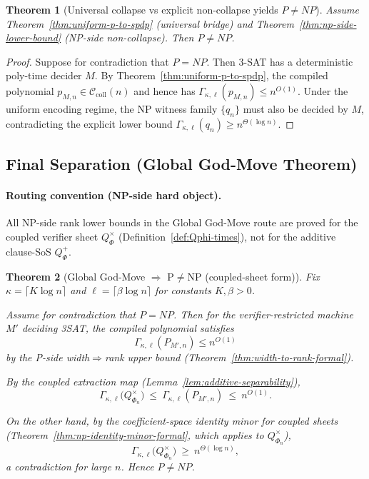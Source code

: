 \documentclass[12pt]{article}
\newtheorem{theorem}{Theorem}
\theoremstyle{definition}
\theoremstyle{definition}
\theoremstyle{remark}
\theoremstyle{remark}
\begin{document}
\begin{theorem}[Universal collapse vs explicit non-collapse yields $P\neq NP$]
\label{thm:universal-separation-criterion}
Assume Theorem~\ref{thm:uniform-p-to-spdp} (universal bridge) and
Theorem~\ref{thm:np-side-lower-bound} (NP-side non-collapse).
Then $P\neq NP$.
\end{theorem}

\begin{proof}
Suppose for contradiction that $P=NP$. Then $3$-SAT has a deterministic poly-time
decider $M$. By Theorem~\ref{thm:uniform-p-to-spdp}, the compiled polynomial
$p_{M,n}\in \mathcal{C}_{\mathrm{coll}}(n)$ and hence has
$\Gamma_{\kappa,\ell}(p_{M,n})\le n^{O(1)}$. Under the uniform encoding regime, the
NP witness family $\{q_n\}$ must also be decided by $M$, contradicting the
explicit lower bound $\Gamma_{\kappa,\ell}(q_n)\ge n^{\Theta(\log n)}$.
\end{proof}

\subsection{Final Separation (Global God-Move Theorem)}

\paragraph{Routing convention (NP-side hard object).}
All NP-side rank lower bounds in the Global God-Move route are proved for the coupled
verifier sheet $Q^{\times}_\Phi$ (Definition~\ref{def:Qphi-times}), not for the additive
clause-SoS $Q^{+}_\Phi$.

\begin{theorem}[Global God-Move $\Rightarrow$ P$\neq$NP (coupled-sheet form)]
\label{thm:godmove-formal}
Fix $\kappa=\lceil K\log n\rceil$ and $\ell=\lceil \beta\log n\rceil$ for constants $K,\beta>0$.

Assume for contradiction that $P=NP$. Then for the verifier-restricted machine $M'$
deciding 3SAT, the compiled polynomial satisfies
\[
\Gamma_{\kappa,\ell}(P_{M',n}) \le n^{O(1)}
\]
by the P-side width$\Rightarrow$rank upper bound (Theorem~\ref{thm:width-to-rank-formal}).

By the coupled extraction map (Lemma~\ref{lem:additive-separability}),
\[
\Gamma_{\kappa,\ell}\!\big(Q^{\times}_{\Phi_n}\big)
\ \le\ \Gamma_{\kappa,\ell}(P_{M',n})
\ \le\ n^{O(1)}.
\]

On the other hand, by the coefficient-space identity minor for coupled sheets
(Theorem~\ref{thm:np-identity-minor-formal}, which applies to $Q^{\times}_{\Phi_n}$),
\[
\Gamma_{\kappa,\ell}\!\big(Q^{\times}_{\Phi_n}\big)\ \ge\ n^{\Theta(\log n)},
\]
a contradiction for large $n$. Hence $P\neq NP$.
\end{theorem}
\end{document}
